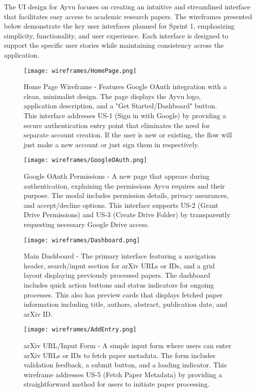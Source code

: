 \documentclass[12pt]{article}
\begin{document}
The UI design for Ayvu focuses on creating an intuitive and streamlined interface that facilitates easy access to academic research papers. The wireframes presented below demonstrate the key user interfaces planned for Sprint 1, emphasizing simplicity, functionality, and user experience. Each interface is designed to support the specific user stories while maintaining consistency across the application.

\begin{figure}[h!tbp]
  \centering
  \texttt{[image: wireframes/HomePage.png]}
  \caption{Home Page Wireframe - Features Google OAuth integration with a clean, minimalist design. The page displays the Ayvu logo, application description, and a "Get Started/Dashboard" button. This interface addresses US-1 (Sign in with Google) by providing a secure authentication entry point that eliminates the need for separate account creation. If the user is new or existing, the flow will just make a new account or just sign them in respectively.}
  \label{fig:home-page}
\end{figure}

\begin{figure}[h!tbp]
  \centering
  \texttt{[image: wireframes/GoogleOAuth.png]}
  \caption{Google OAuth Permissions - A new page that appears during authentication, explaining the permissions Ayvu requires and their purpose. The modal includes permission details, privacy assurances, and accept/decline options. This interface supports US-2 (Grant Drive Permissions) and US-3 (Create Drive Folder) by transparently requesting necessary Google Drive access.}
  \label{fig:permissions-modal}
\end{figure}

\begin{figure}[h!tbp]
  \centering
  \texttt{[image: wireframes/Dashboard.png]}
  \caption{Main Dashboard - The primary interface featuring a navigation header, search/input section for arXiv URLs or IDs, and a grid layout displaying previously processed papers. The dashboard includes quick action buttons and status indicators for ongoing processes. This also has preview cards that displays fetched paper information including title, authors, abstract, publication date, and arXiv ID.}
  \label{fig:main-dashboard}
\end{figure}

\begin{figure}[h!tbp]
  \centering
  \texttt{[image: wireframes/AddEntry.png]}
  \caption{arXiv URL/Input Form - A simple input form where users can enter arXiv URLs or IDs to fetch paper metadata. The form includes validation feedback, a submit button, and a loading indicator. This wireframe addresses US-5 (Fetch Paper Metadata) by providing a straightforward method for users to initiate paper processing.}
  \label{fig:arxiv-input}
\end{figure}
\end{document}
